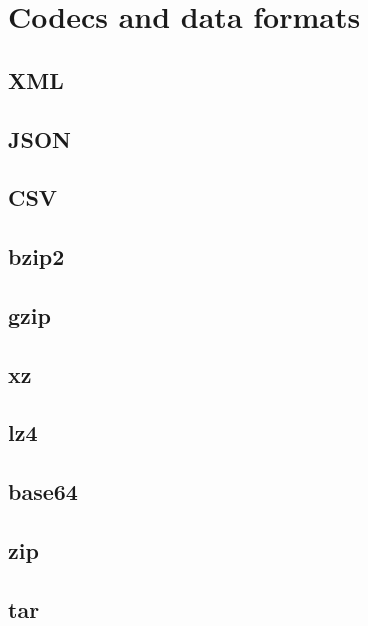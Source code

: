 
\chapter{Codecs and data formats}

\section{XML}

\section{JSON}

\section{CSV}

\section{bzip2}

\section{gzip}

\section{xz}

\section{lz4}

\section{base64}

\section{zip}

\section{tar}
